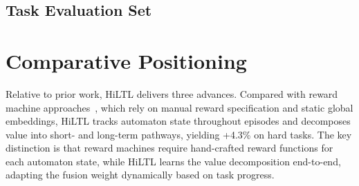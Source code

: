 \documentclass{article}
\begin{document}
\subsection{Task Evaluation Set}
\label{app:task_config}

\begin{table}[htbp]
\centering
\caption{Task Evaluation Set}
\label{tab:tasks}
\end{table}

\section{Comparative Positioning}
\label{app:comparison}

Relative to prior work, HiLTL delivers three advances. Compared with reward machine approaches~\citep{IcarteRewardMachines2019}, which rely on manual reward specification and static global embeddings, HiLTL tracks automaton state throughout episodes and decomposes value into short- and long-term pathways, yielding +4.3\% on hard tasks. The key distinction is that reward machines require hand-crafted reward functions for each automaton state, while HiLTL learns the value decomposition end-to-end, adapting the fusion weight dynamically based on task progress.
\end{document}
